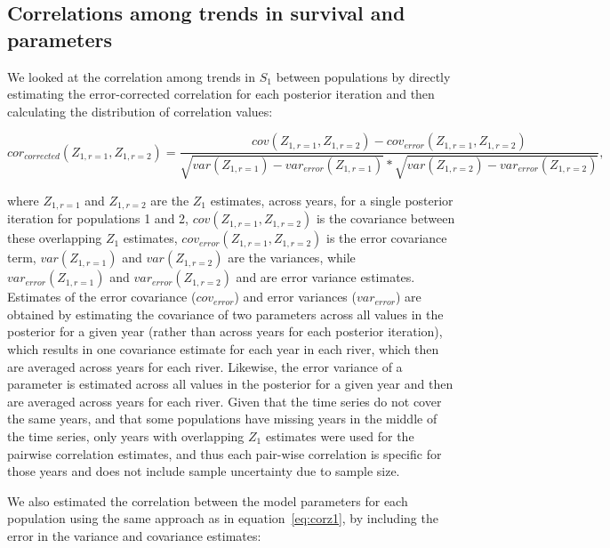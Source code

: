 \documentclass[12pt]{article}
\newcommand{\So}{$S_{1}$\xspace}
\begin{document}
\subsection*{Correlations among trends in survival and parameters}

We looked at the correlation among trends in \So between populations by
directly estimating the error-corrected correlation for each posterior
iteration and then calculating the distribution of correlation values:

\begin{equation}
cor_{corrected}(Z_{1,r=1},Z_{1,r=2}) = \frac{cov(Z_{1,r=1}, Z_{1,r=2}) - cov_{error}(Z_{1,r=1}, Z_{1,r=2})}
    {\sqrt{var(Z_{1,r=1}) - var_{error}(Z_{1,r=1})}*\sqrt{var(Z_{1,r=2}) - var_{error}(Z_{1,r=2})}}, \label{eq:corz1}
\end{equation}


where $Z_{1,r=1}$ and $Z_{1,r=2}$ are the $Z_1$ estimates, across years, for a
single posterior iteration for populations 1 and 2,
$cov(Z_{1,r=1}, Z_{1,r=2})$ is the covariance between these overlapping $Z_1$ estimates, 
$cov_{error}(Z_{1,r=1}, Z_{1,r=2})$ is the error covariance term,   
$var(Z_{1,r=1})$ and $var(Z_{1,r=2})$ are the variances, while
$var_{error}(Z_{1,r=1})$ and $var_{error}(Z_{1,r=2})$ and are error variance estimates.
Estimates of the error covariance ($cov_{error}$) and error
variances ($var_{error}$) are obtained by estimating the covariance of
two parameters across all values in the posterior for a given year (rather
than across years for each posterior iteration), which results in one
covariance estimate for each year in each river, which then are averaged
across years for each river. Likewise, the error variance of a parameter is estimated  
across all values in the posterior for a given year and then are averaged
across years for each river.
Given that the time series do not cover the same years, and that some populations
have missing years in the middle of the time series, only years with overlapping
$Z_1$ estimates were used for the pairwise correlation estimates, and thus
each pair-wise correlation is specific for those years and does not include sample uncertainty due to sample size.

We also estimated the correlation between the model parameters for each population using
the same approach as in equation~\ref{eq:corz1},
by including the error in the variance and covariance estimates:
\end{document}
